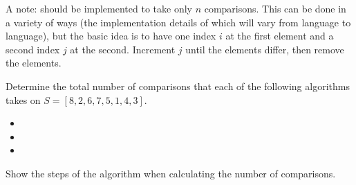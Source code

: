 \documentclass[draft]{article}
\begin{document}
\begin{solution}
    A note:  should be implemented to take only $n$ comparisons. This can be done in a variety of ways (the implementation details of which will vary from language to language), but the basic idea is to have one index $i$ at the first element and a second index $j$ at the second. Increment $j$ until the elements differ, then remove the elements.
\end{solution}

\begin{exercise}{5.1}
    Determine the total number of comparisons that each of the following algorithms takes on $S = [8, 2, 6, 7, 5, 1, 4, 3]$.
    \begin{itemize}[nosep]
        \item {}
        \item {}
        \item {}
    \end{itemize}
    Show the steps of the algorithm when calculating the number of comparisons.
\end{exercise}
\end{document}

